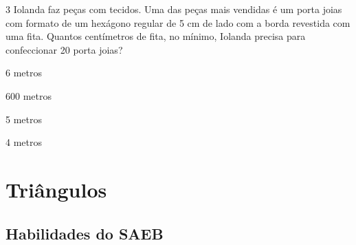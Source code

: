 \num{3} Iolanda faz peças com tecidos. Uma das peças mais vendidas é um porta
joias com formato de um hexágono regular de 5 cm de lado com a borda
revestida com uma fita. Quantos centímetros de fita, no mínimo, Iolanda
precisa para confeccionar 20 porta joias?
\item 6 metros
\item 600 metros
\item 5 metros
\item 4 metros











\chapter{Triângulos}

\section{Habilidades do SAEB}

